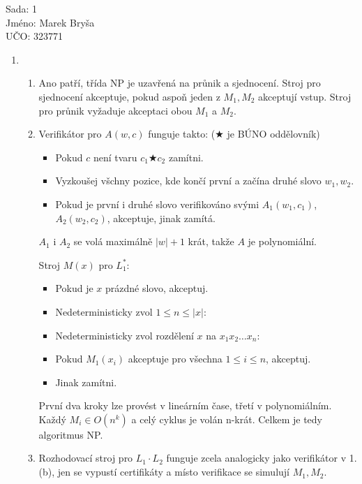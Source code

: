 \documentclass[a4wide,8pt]{extarticle}
\begin{document}
\begin{flushleft}
Sada: 1 \\ 
Jméno: Marek Bryša \\
UČO: 323771\\
\end{flushleft}
\begin{enumerate}
  \item
	\begin{enumerate}
		\item
			Ano patří, třída NP je uzavřená na průnik a sjednocení. Stroj pro sjednocení akceptuje, pokud aspoň jeden z $M_1,M_2$ akceptují vstup. Stroj pro průnik vyžaduje akceptaci obou $M_1$ a $M_2$.
		\item
			Verifikátor pro $A(w,c)$ funguje takto: ($\bigstar$ je BÚNO oddělovník)
			\begin{itemize}
				\item Pokud $c$ není tvaru $c_1\bigstar c_2$ zamítni.			
				\item Vyzkoušej všchny pozice, kde končí první a začína druhé slovo $w_1, w_2$.
				\item Pokud je první i druhé slovo verifikováno svými $A_1(w_1,c_1)$, $A_2(w_2,c_2)$, akceptuje, jinak zamítá.
			\end{itemize}
			$A_1$ i $A_2$ se volá maximálně $|w|+1$ krát, takže $A$ je polynomiální.
			
			Stroj $M(x)$ pro $L_1^*$:
			\begin{itemize}
				\item	Pokud je $x$ prázdné slovo, akceptuj.
				\item Nedeterministicky zvol $1\leq n \leq |x|$:
				\item Nedeterministicky zvol rozdělení $x$ na $x_1x_2\dots x_n$:
				\item Pokud $M_1(x_i)$ akceptuje pro všechna $1\leq i \leq n$, akceptuj.
				\item Jinak zamítni.
			\end{itemize}
			První dva kroky lze provést v lineárním čase, třetí v polynomiálním. Každý $M_i\in O(n^k)$ a celý cyklus je volán n-krát. Celkem je tedy algoritmus NP.
		\item
			Rozhodovací stroj pro $L_1\cdot L_2$ funguje zcela analogicky jako verifikátor v 1.(b), jen se vypustí certifikáty a místo verifikace se simulují $M_1, M_2$.
			

\end{enumerate}
\end{enumerate}
\end{document}
